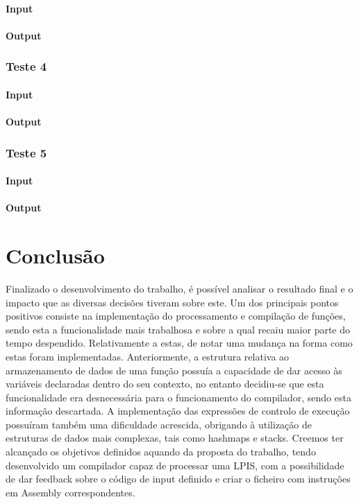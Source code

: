 \documentclass[a4paper,10pt]{report}
\begin{document}
\subsubsection{Input}

\subsubsection{Output}



\subsection{Teste 4}
\subsubsection{Input}

\subsubsection{Output}


\subsection{Teste 5}
\subsubsection{Input}

\subsubsection{Output}



\chapter{Conclusão}
\label{cap:intro}

Finalizado o desenvolvimento do trabalho, é possível analisar o resultado final e o impacto que as diversas decisões tiveram sobre este. Um dos principais pontos positivos consiste na implementação do processamento e compilação de funções, sendo esta a funcionalidade mais trabalhosa e sobre a qual recaiu maior parte do tempo despendido. Relativamente a estas, de notar uma mudança na forma como estas foram implementadas. Anteriormente, a estrutura relativa ao armazenamento de dados de uma função possuía a capacidade de dar acesso às variáveis declaradas dentro do seu contexto, no entanto decidiu-se que esta funcionalidade era desnecessária para o funcionamento do compilador, sendo esta informação descartada. A implementação das expressões de controlo de execução possuíram também uma dificuldade acrescida, obrigando à utilização de estruturas de dados mais complexas, tais como hashmaps e stacks. Creemos ter alcançado os objetivos definidos aquando da proposta do trabalho, tendo desenvolvido um compilador capaz de processar uma LPIS, com a possibilidade de dar feedback sobre o código de input definido e criar o ficheiro com instruções em Assembly correspondentes.
\end{document}
